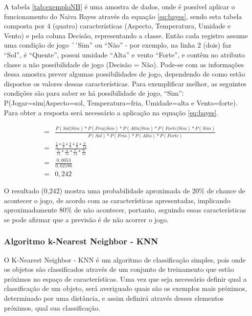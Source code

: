 A tabela \ref{tab:exemploNB} é uma amostra de dados, onde é possível aplicar o funcionamento do Naiva Bayes através da equação \ref{eq:bayes}, sendo esta tabela composta por 4 (quatro) características (Aspecto, Temperatura, Umidade e Vento) e pela coluna Decisão, representando a classe. Então cada registro assume uma condição de jogo ´´Sim'' ou ``Não'' - por exemplo, na linha 2 (dois) faz ``Sol'', é ``Quente'', possui umidade ``Alta'' e vento ``Forte'', e contêm no atributo classe a não possibilidade de jogo (Decisão = Não). Pode-se com as informações dessa amostra prever algumas possibilidades de jogo, dependendo de como estão dispostos os valores dessas características. Para exemplificar melhor, as seguintes condições  são para saber se há possibilidade de jogo, ``Sim'': P(Jogar=sim|Aspecto=sol, Temperatura=fria, Umidade=alta e Vento=forte). Para obter a resposta será necessário a aplicação na equação \ref{eq:bayes}.  


\begin{eqnarray}
&=& \frac{ P(Sol|Sim)*P(Fria|Sim)*P(Alta|Sim)*P(Forte|Sim)*P(Sim) }{ P(Sol)*P(Fria)*P(Alta)*P(Forte) } \nonumber \\
 &=& \frac{ \frac{2}{9}*\frac{3}{9}*\frac{3}{9}*\frac{3}{9}*\frac{9}{14} }{ \frac{5}{14}*\frac{4}{14}*\frac{7}{14}*\frac{6}{14} } \nonumber \\
 &=& \frac{0,0053}{0,02186} \nonumber \\
 &=& 0,242
 \label{eq:resolNB}
\end{eqnarray}

O resultado (0,242) mostra uma probabilidade aproximada de ${20\%}$ de chance de acontecer o jogo, de acordo com as características apresentadas, implicando aproximadamente  ${80\%}$ de não acontecer, portanto, seguindo essas características se pode afirmar que a previsão é de não acorrer o jogo.

\subsubsection{Algoritmo k-Nearest Neighbor - KNN}\label{cap:refTeor:sssec:knn}

O K-Nearest Neighbor - KNN é um algoritmo de classificação simples, pois onde os objetos são classificados através de um conjunto de treinamento que estão próximos no espaço de características. Uma vez que seja necessário definir qual a classificação de um objeto, será averiguado quais são os exemplos mais próximos, determinado por uma distância, e assim definirá através desses elementos próximos, qual sua classificação. 

